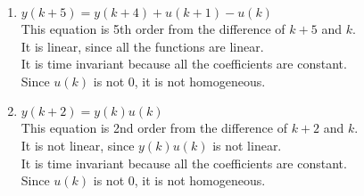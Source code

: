 \documentclass[12pt]{article}
\newenvironment{problem}[2][Problem]{\begin{trivlist}
\item[\hskip \labelsep {\bfseries #1}\hskip \labelsep {\bfseries #2.}]}{\end{trivlist}}
\begin{document}
\begin{problem}{1}
\begin{enumerate}[label=\alph*.]
        \item $y(k+5) = y(k+4) + u(k+1) - u(k)$\\
        This equation is 5th order from the difference of $k+5$ and $k$.\\
        It is linear, since all the functions are linear.\\
        It is time invariant because all the coefficients are constant.\\
        Since $u(k)$ is not 0, it is not homogeneous.

        \item $y(k+2) = y(k)u(k)$\\
        This equation is 2nd order from the difference of $k+2$ and $k$.\\
        It is not linear, since $y(k)u(k)$ is not linear.\\
        It is time invariant because all the coefficients are constant.\\
        Since $u(k)$ is not 0, it is not homogeneous.
    \end{enumerate}

\end{problem}
\pagebreak
\end{document}

